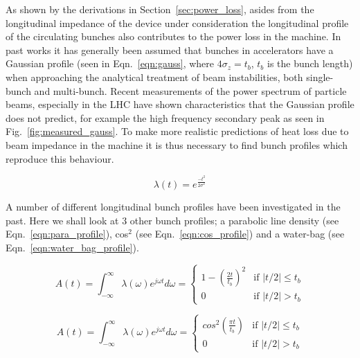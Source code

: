 As shown by the derivations in Section~\ref{sec:power_loss}, asides from the longitudinal impedance of the device under consideration the longitudinal profile of the circulating bunches also contributes to the power loss in the machine. In past works it has generally been assumed that bunches in accelerators have a Gaussian profile \cite{Grudiev:LongTransSecCol} (seen in Eqn.~\ref{eqn:gauss}, where $4\sigma_{z} = t_{b}$, $t_{b}$ is the bunch length) when approaching the analytical treatment of beam instabilities, both single-bunch and multi-bunch. Recent measurements of the power spectrum of particle beams, especially in the LHC \cite{Baudrenghien:LHCPowSpec} have shown characteristics that the Gaussian profile does not predict, for example the high frequency secondary peak as seen in Fig.~\ref{fig:measured_gauss}. To make more realistic predictions of heat loss due to beam impedance in the machine it is thus necessary to find bunch profiles which reproduce this behaviour.

\begin{equation}
\lambda \left( t \right) = e^{\frac{-t^{2}}{2\sigma^{2}}}
\label{eqn:gauss}
\end{equation}

A number of different longitudinal bunch profiles have been investigated in the past. Here we shall look at 3 other bunch profiles; a parabolic line density (see Eqn.~\ref{eqn:para_profile}), cos$^{2}$ (see Eqn.~\ref{eqn:cos_profile}) and a water-bag (see Eqn.~\ref{eqn:water_bag_profile}).

\begin{equation}
A\left( t \right) = \int^{\infty}_{-\infty} \lambda \left( \omega \right) e^{j\omega t} d\omega = 
\begin{cases}1-\left( \frac{2t} {t_{b}} \right)^{2} &\textrm{if $| t/2 | \leq t_{b}$}\\
0								&\textrm{if $| t/2 | > t_{b}$}
\end{cases}
\label{eqn:para_profile}
\end{equation}

\begin{equation}
A\left( t \right) = \int^{\infty}_{-\infty} \lambda \left( \omega \right) e^{j\omega t} d\omega = 
\begin{cases}
cos^{2}\left( \frac{\pi t} {t_{b}} \right) &\textrm{if $| t/2 | \leq t_{b}$}\\
0								&\textrm{if $| t/2 | > t_{b}$}
\end{cases}
\label{eqn:cos_profile}
\end{equation}


